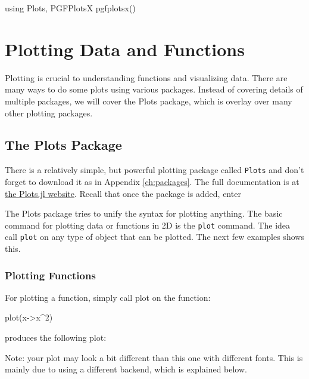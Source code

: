 
\begin{jlcode}[plots]
using Plots, PGFPlotsX
pgfplotsx()
\end{jlcode}


\chapter{Plotting Data and Functions}\label{chapter-11-plotting-data-and-functions}


Plotting is crucial to understanding functions and visualizing data.
There are many ways to do some plots using various packages. Instead of covering details of multiple packages, we will cover the Plots package, which is overlay over many other plotting packages.  

\hypertarget{the-plots-package}{%
\section{The Plots Package}\label{the-plots-package}}

There is a relatively simple, but powerful plotting package called
\texttt{Plots} and don't forget to download it as in Appendix \ref{ch:packages}. The full documentation
is at \href{http://docs.juliaplots.org/latest/}{the Plots.jl website}.
Recall that once the package is added, enter 


The Plots package tries to unify the syntax for plotting anything. The
basic command for plotting data or functions in 2D is the \texttt{plot}
command. The idea call \texttt{plot} on any type of object that can be plotted. The next few examples shows this.


\subsection{Plotting Functions}

For plotting a function, simply call plot on the function: 
\begin{jlblock}[plots]
plot(x->x^2)
\end{jlblock}
%
produces the following plot: 
\begin{center}
\pgfplotsset{scale=0.5}
\end{center}
Note: your plot may look a bit different than this one with different fonts.  This is mainly due to using a different backend, which is explained below. 

